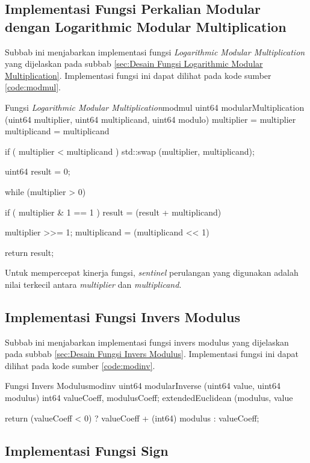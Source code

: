 \subsection{Implementasi Fungsi Perkalian Modular dengan Logarithmic Modular Multiplication}

Subbab ini menjabarkan implementasi fungsi \textit{Logarithmic Modular Multiplication} yang dijelaskan pada subbab \ref{sec:Desain Fungsi Logarithmic Modular Multiplication}. Implementasi fungsi ini dapat dilihat pada kode sumber \ref{code:modmul}.
\begin{code}[firstnumber=0, float=h!]{Fungsi \textit{Logarithmic Modular Multiplication}}{modmul}
uint64 modularMultiplication (uint64 multiplier, uint64 multiplicand, uint64 modulo)
multiplier = multiplier %
multiplicand = multiplicand %

if ( multiplier < multiplicand )
std::swap (multiplier, multiplicand);

uint64 result = 0;

while (multiplier > 0)
{
	if ( multiplier & 1 == 1 )
	{
		result = (result + multiplicand) %
	}
	
	multiplier >>= 1;
	multiplicand = (multiplicand << 1) %
}

return result;
\end{code}

Untuk mempercepat kinerja fungsi, \textit{sentinel} perulangan yang digunakan adalah nilai terkecil antara \textit{multiplier} dan \textit{multiplicand}.

\subsection{Implementasi Fungsi Invers Modulus}

Subbab ini menjabarkan implementasi fungsi invers modulus yang dijelaskan pada subbab \ref{sec:Desain Fungsi Invers Modulus}. Implementasi fungsi ini dapat dilihat pada kode sumber \ref{code:modinv}.
\begin{code}[firstnumber=0, float=h!]{Fungsi Invers Modulus}{modinv}
uint64 modularInverse (uint64 value, uint64 modulus)
int64 valueCoeff, modulusCoeff;
extendedEuclidean (modulus, value %

return (valueCoeff < 0) ? valueCoeff + (int64) modulus : valueCoeff;
\end{code}

\subsection{Implementasi Fungsi Sign}

